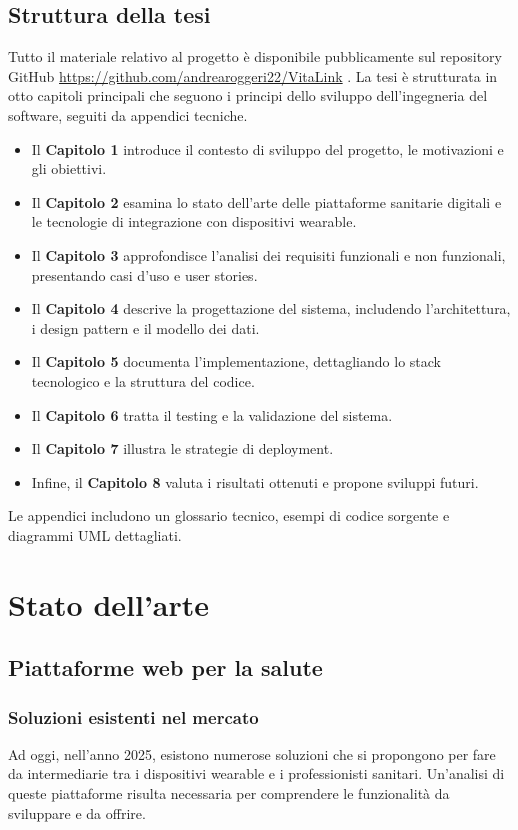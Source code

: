 \documentclass[12pt,a4paper,oneside]{report}
\begin{document}
\section{Struttura della tesi}
Tutto il materiale relativo al progetto è disponibile pubblicamente sul repository GitHub \url{https://github.com/andrearoggeri22/VitaLink} \cite{github}.
La tesi è strutturata in otto capitoli principali che seguono i principi dello sviluppo dell'ingegneria del software, seguiti da appendici tecniche.
\begin{itemize}
    \item Il \textbf{Capitolo 1} introduce il contesto di sviluppo del progetto, le motivazioni e gli obiettivi.
    \item Il \textbf{Capitolo 2} esamina lo stato dell'arte delle piattaforme sanitarie digitali e le tecnologie di integrazione con dispositivi wearable.
    \item Il \textbf{Capitolo 3} approfondisce l'analisi dei requisiti funzionali e non funzionali, presentando casi d'uso e user stories.
    \item Il \textbf{Capitolo 4} descrive la progettazione del sistema, includendo l'architettura, i design pattern e il modello dei dati.
    \item Il \textbf{Capitolo 5} documenta l'implementazione, dettagliando lo stack tecnologico e la struttura del codice.
    \item Il \textbf{Capitolo 6} tratta il testing e la validazione del sistema.
    \item Il \textbf{Capitolo 7} illustra le strategie di deployment.
    \item Infine, il \textbf{Capitolo 8} valuta i risultati ottenuti e propone sviluppi futuri.
\end{itemize}
Le appendici includono un glossario tecnico, esempi di codice sorgente e diagrammi UML dettagliati.

\chapter{Stato dell'arte}

\section{Piattaforme web per la salute}

\subsection{Soluzioni esistenti nel mercato}
Ad oggi, nell'anno 2025, esistono numerose soluzioni che si propongono per fare da intermediarie tra i dispositivi wearable e i professionisti sanitari. Un'analisi di queste piattaforme risulta necessaria per comprendere le funzionalità da sviluppare e da offrire.
\end{document}
